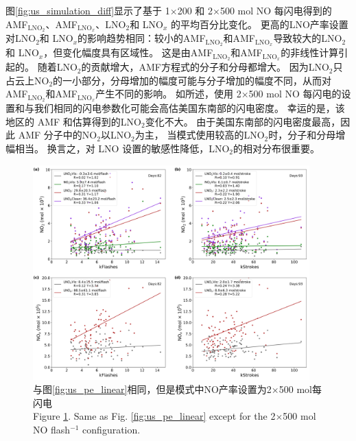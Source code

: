 图\ref{fig:us_simulation_diff}显示了基于 1$\times$200 和 2$\times$500 mol NO 每闪电得到的AMF$_\textrm{LNO$_2$}$、AMF$_\textrm{LNO$_x$}$、LNO$_2$和 LNO$_x$ 的平均百分比变化。
更高的LNO产率设置对LNO$_2$和 LNO$_x$的影响趋势相同：较小的AMF$_\textrm{LNO$_2$}$和AMF$_\textrm{LNO$_x$}$导致较大的LNO$_2$和 LNO$_x$，但变化幅度具有区域性。
这是由AMF$_\textrm{LNO$_2$}$和AMF$_\textrm{LNO$_x$}$的非线性计算引起的。
随着LNO$_2$的贡献增大，AMF方程式的分子和分母都增大。
因为LNO$_2$只占云上NO$_2$的一小部分，分母增加的幅度可能与分子增加的幅度不同，从而对AMF$_\textrm{LNO$_2$}$和AMF$_\textrm{LNO$_x$}$产生不同的影响。
如\citet{Zhu.2019}所述，使用 2$\times$500 mol NO 每闪电的设置和与我们相同的闪电参数化可能会高估美国东南部的闪电密度。
幸运的是，该地区的 AMF 和估算得到的LNO$_2$变化不大。
由于美国东南部的闪电密度最高，因此 AMF 分子中的NO$_2$以LNO$_2$为主，
当模式使用较高的LNO$_2$时，分子和分母增幅相当。
换言之，对 LNO 设置的敏感性降低，LNO$_2$的相对分布很重要。

\begin{figure}[H]
\centering
\includegraphics[width=0.95\textwidth]{./figures/us_pe_linear_2x500.png}
\caption{与图\ref{fig:us_pe_linear}相同，但是模式中NO产率设置为2$\times$500 mol每闪电 \\Figure \ref{fig:us_pe_linear_2x500}. Same as Fig. \ref{fig:us_pe_linear} except for the 2$\times$500 mol NO flash$^{-1}$ configuration.}
\label{fig:us_pe_linear_2x500}
\end{figure}


